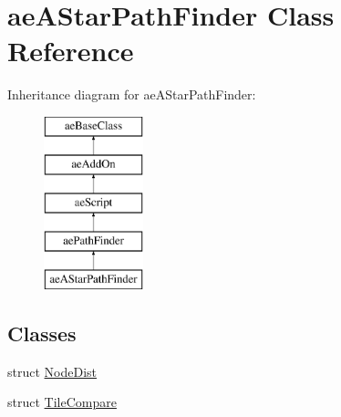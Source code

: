\hypertarget{classae_a_star_path_finder}{}\section{ae\+A\+Star\+Path\+Finder Class Reference}
\label{classae_a_star_path_finder}
Inheritance diagram for ae\+A\+Star\+Path\+Finder\+:\begin{figure}[H]
\begin{center}
\leavevmode
\includegraphics[height=5.000000cm]{classae_a_star_path_finder}
\end{center}
\end{figure}
\subsection*{Classes}
\begin{DoxyCompactItemize}
\item 
struct \hyperlink{structae_a_star_path_finder_1_1_node_dist}{Node\+Dist}
\item 
struct \hyperlink{structae_a_star_path_finder_1_1_tile_compare}{Tile\+Compare}
\end{DoxyCompactItemize}
